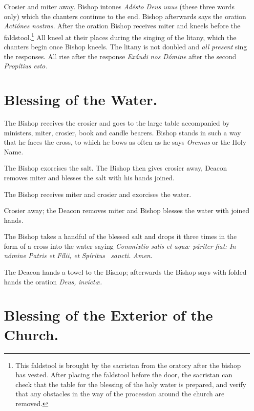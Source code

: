 \documentclass[letterpaper]{report}
\begin{document}
{    \rubric Crosier and miter away. Bishop intones \textit{Ad\'esto Deus unus}
    (these three words only) which the chanters continue to the end. Bishop
    afterwards says the oration \textit{Acti\'ones nostras}. After the oration
    Bishop receives miter and kneels before the faldstool.\footnote{This
    faldstool is brought by the sacristan from the oratory after the bishop has
    vested. After placing the faldstool before the door, the sacristan can
    check that the table for the blessing of the holy water is prepared, and
    verify that any obstacles in the way of the procession around the church
    are removed.} All kneel at their places during the singing of the litany,
    which the chanters begin once Bishop kneels. The litany is not doubled and
    \textit{all present} sing the responses. All rise after the response
    \textit{Ex\'audi nos D\'omine} after the second \textit{Prop\'itius esto.}

    \section{Blessing of the Water.}

    \rubric The Bishop receives the crosier and goes to the large table
    accompanied by ministers, miter, crosier, book and candle bearers. Bishop
    stands in such a way that he faces the cross, to which he bows as often as
    he says \textit{Oremus} or the Holy Name.

    \rubric The Bishop exorcises the salt. The Bishop then gives crosier away,
    Deacon removes miter and blesses the salt with his hands joined.

    \rubric The Bishop receives miter and crosier and exorcises the water.

    \rubric Crosier away; the Deacon removes miter and Bishop blesses the water
    with joined hands.

    \rubric The Bishop takes a handful of the blessed salt and drops it three
    times in the form of a cross into the water saying \textit{Commíxtio salis
    et aqu\ae\ páriter fiat: In nómine Pa\cross tris et Fí\cross lii, et
    Spíritus \cross\ sancti. \rbar Amen.}

    \rubric The Deacon hands a towel to the Bishop; afterwards the Bishop says
    with folded hands the oration \textit{Deus, invíct\ae.}

    \section{Blessing of the Exterior of the Church.}

}
\end{document}
